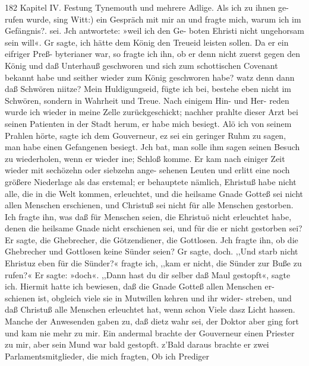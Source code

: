 182 Kapitel IV.
Festung Tynemouth und mehrere Adlige. Als ich zu ihnen ge-
rufen wurde, sing Witt:) ein Gespräch mit mir an und fragte mich,
warum ich im Gefängnis?. sei. Jch antwortete: »weil ich den Ge-
boten Ehristi nicht ungehorsam sein will«. Gr sagte, ich hätte
dem König den Treueid leisten sollen. Da er ein eifriger Preß-
byterianer war, so fragte ich ihn, ob er denn nicht zuerst gegen
den König und daß Unterhauß geschworen und sich zum
schottischen Covenant bekannt habe und seither wieder zum König
geschworen habe? watz denn dann daß Schwören niitze? Mein
Huldigungseid, fügte ich bei, bestehe eben nicht im Schwören,
sondern in Wahrheit und Treue. Nach einigem Hin- und Her-
reden wurde ich wieder in meine Zelle zurückgeschickt; nachher
prahlte dieser Arzt bei seinen Patienten in der Stadt herum, er
habe mich besiegt. Alö ich von seinem Prahlen hörte, sagte ich
dem Gouverneur, ez sei ein geringer Ruhm zu sagen, man habe
einen Gefangenen besiegt. Jch bat, man solle ihm sagen seinen
Besuch zu wiederholen, wenn er wieder ine; Schloß komme. Er
kam nach einiger Zeit wieder mit sechözehn oder siebzehn ange-
sehenen Leuten und erlitt eine noch größere Niederlage als das
erstemal; er behauptete nämlich, Ehristuß habe nicht alle, die in
die Welt kommen, erleuchtet, und die heilsame Gnade Gotteß sei
nicht allen Menschen erschienen, und Christuß sei nicht für alle
Menschen gestorben. Ich fragte ihn, was daß für Menschen
seien, die Ehristuö nicht erleuchtet habe, denen die heilsame Gnade
nicht erschienen sei, und für die er nicht gestorben sei? Er sagte,
die Ghebrecher, die Götzendiener, die Gottlosen. Jch fragte ihn,
ob die Ghebrecher und Gottlosen keine Sünder seien? Gr sagte,
doch. ,,Und starb nicht Ehristuz eben für die Sünder?« fragte ich,
,,kam er nicht, die Sünder zur Buße zu rufen?« Er sagte: »doch«.
,,Dann hast du dir selber daß Maul gestopft«, sagte ich. Hiermit
hatte ich bewiesen, daß die Gnade Gotteß allen Menschen er-
schienen ist, obgleich viele sie in Mutwillen kehren und ihr wider-
streben, und daß Christuß alle Menschen erleuchtet hat, wenn
schon Viele dasz Licht hassen. Manche der Anwesenden gaben zu,
daß dietz wahr sei, der Doktor aber ging fort und kam nie mehr
zu mir.
Ein andermal brachte der Gouverneur einen Priester zu
mir, aber sein Mund war bald gestopft. z’Bald daraus brachte
er zwei Parlamentsmitglieder, die mich fragten, Ob ich Prediger


